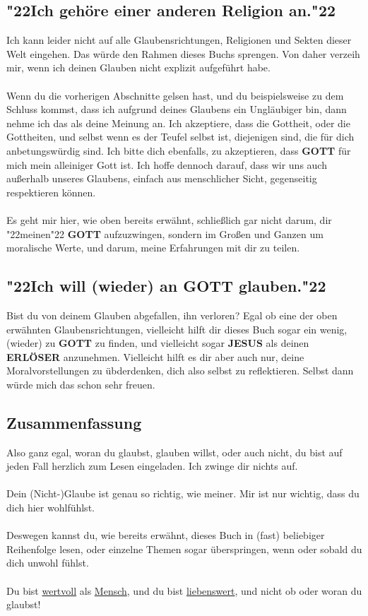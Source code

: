 \documentclass[12pt,a5paper]{article}
\newcommand{\Erloeser}[0]{\textbf{ERL\"OSER}}
\newcommand{\Gott}[0]{\textbf{GOTT}}
\newcommand{\Jesus}[0]{\textbf{JESUS}}
\newcommand{\q}[1]{\char"22{#1}\char"22 }
\begin{document}
	\subsection{\q{Ich geh\"ore einer anderen Religion an.}}
		Ich kann leider nicht auf alle Glaubensrichtungen,
		Religionen und Sekten dieser Welt eingehen.
		Das w\"urde den Rahmen dieses Buchs sprengen.
		Von daher verzeih mir,
		wenn ich deinen Glauben nicht explizit aufgef\"uhrt habe.
		\\
		\\
		Wenn du die vorherigen Abschnitte gelsen hast,
		und du beispielsweise zu dem Schluss kommst,
		dass ich aufgrund deines Glaubens ein Ungl\"aubiger bin,
		dann nehme ich das als deine Meinung an.
		Ich akzeptiere,
		dass die Gottheit,
		oder die Gottheiten,
		und selbst wenn es der Teufel selbst ist,
		diejenigen sind,
		die f\"ur dich anbetungsw\"urdig sind.
		Ich bitte dich ebenfalls,
		zu akzeptieren,
		dass {\Gott} f\"ur mich mein alleiniger Gott ist.
		Ich hoffe dennoch darauf,
		dass wir uns auch au{\ss}erhalb unseres Glaubens,
		einfach aus menschlicher Sicht,
		gegenseitig respektieren k\"onnen.
		\\
		\\
		Es geht mir hier,
		wie oben bereits erw\"ahnt,
		schlie{\ss}lich gar nicht darum,
		dir \q{meinen} {\Gott} aufzuzwingen,
		sondern im Gro{\ss}en und Ganzen um moralische Werte,
		und darum,
		meine Erfahrungen mit dir zu teilen.


	\subsection{\q{Ich will (wieder) an {\Gott} glauben.}}
		Bist du von deinem Glauben abgefallen, ihn verloren?
		Egal ob eine der oben erw\"ahnten Glaubensrichtungen,
		vielleicht hilft dir dieses Buch sogar ein wenig,
		(wieder) zu {\Gott} zu finden,
		und vielleicht sogar {\Jesus} als deinen {\Erloeser} anzunehmen.
		Vielleicht hilft es dir aber auch nur,
		deine Moralvorstellungen zu \"ubderdenken,
		dich also selbst zu reflektieren.
		Selbst dann w\"urde mich das schon sehr freuen.
		
	\subsection{Zusammenfassung}
		Also ganz egal,
		woran du glaubst,
		glauben willst,
		oder auch nicht,
		du bist auf jeden Fall herzlich zum Lesen eingeladen.
		Ich zwinge dir nichts auf.
		\\
		\\
		Dein (Nicht-)Glaube ist genau so richtig,
		wie meiner.
		Mir ist nur wichtig,
		dass du dich hier wohlf\"uhlst.
		\\
		\\
		Deswegen kannst du,
		wie bereits erw\"ahnt,
		dieses Buch in (fast) beliebiger Reihenfolge lesen,
		oder einzelne Themen sogar \"uberspringen,
		wenn oder sobald du dich unwohl f\"uhlst.
		\\
		\\
		Du bist \underline{wertvoll} als \underline{Mensch},
		und du bist \underline{liebenswert},
		und nicht ob oder woran du glaubst!
\end{document}
